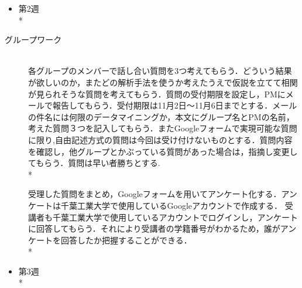 \begin{itemize}
 \item 第2週 \vspace{0.1in} \\*
\end{itemize}

\begin{description}
 \item[グループワーク]\mbox{}\\ 
	    各グループのメンバーで話し合い質問を3つ考えてもらう．どういう結果が欲しいのか，またどの解析手法を使うか考えたうえで仮説を立てて相関が見られそうな質問を考えてもらう．質問の受付期限を設定し，PMにメールで報告してもらう．受付期限は11月2日～11月6日までとする．メールの件名には何限のデータマイニングか，本文にグループ名とPMの名前，考えた質問３つを記入してもらう．またGoogleフォームで実現可能な質問に限り,自由記述方式の質問は今回は受け付けないものとする．質問内容を確認し，他グループとかぶっている質問があった場合は，指摘し変更してもらう．質問は早い者勝ちとする.\vspace{0.1in} \\*

受理した質問をまとめ，Googleフォームを用いてアンケート化する．アンケートは千葉工業大学で使用しているGoogleアカウントで作成する．
受講者も千葉工業大学で使用しているアカウントでログインし，アンケートに回答してもらう．それにより受講者の学籍番号がわかるため，誰がアンケートを回答したか把握することができる．\vspace{0.1in} \\*


\end{description}

\newpage


\begin{itemize}
 \item 第3週 \vspace{0.1in} \\*
\end{itemize}


